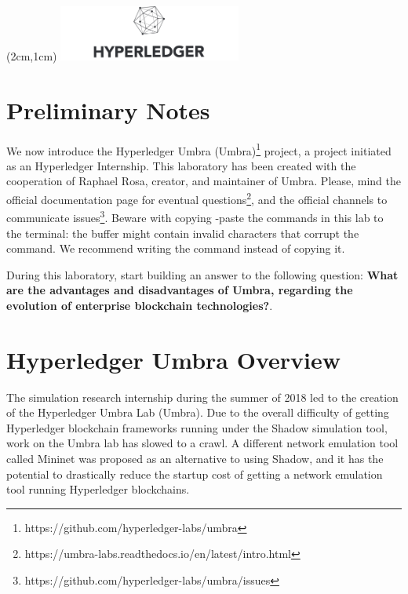 \documentclass[12pt,a4paper]{article}
\theoremstyle{definition}
\begin{document}
\textblockorigin{-34pt}{-12pt}
\begin{textblock*}{10cm}(2cm,1cm)
\includegraphics[width=6cm]{hyperledger.png}
\end{textblock*}
\newtheorem{mydef}{Definition}

\section*{Preliminary Notes}
We now introduce the Hyperledger Umbra (Umbra)\footnote{https://github.com/hyperledger-labs/umbra} project, a project initiated as an Hyperledger Internship. This laboratory has been created with the cooperation of Raphael Rosa, creator, and maintainer of Umbra. Please, mind the official documentation page for eventual questions\footnote{https://umbra-labs.readthedocs.io/en/latest/intro.html}, and the official channels to communicate issues\footnote{https://github.com/hyperledger-labs/umbra/issues}. Beware with copying -paste the commands in this lab to the terminal: the buffer might contain invalid characters that corrupt the command. We recommend writing the command instead of copying it.

During this laboratory, start building an answer to the following question: \textbf{What are the advantages and disadvantages of Umbra, regarding the evolution of enterprise blockchain technologies?}.



\section{Hyperledger Umbra Overview}
The simulation research internship during the summer of 2018 led to the creation of the Hyperledger Umbra Lab (Umbra). Due to the overall difficulty of getting Hyperledger blockchain frameworks running under the Shadow simulation tool, work on the Umbra lab has slowed to a crawl. A different network emulation tool called Mininet was proposed as an alternative to using Shadow, and it has the potential to drastically reduce the startup cost of getting a network emulation tool running Hyperledger blockchains.
\end{document}
